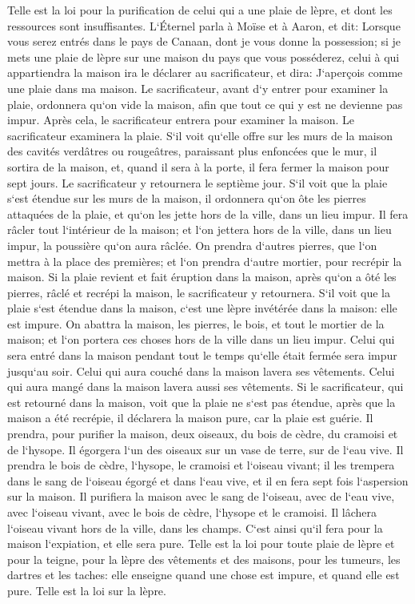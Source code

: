 \verse Telle est la loi pour la purification de celui qui a une plaie de lèpre, et dont les ressources sont insuffisantes. 
\verse L`Éternel parla à Moïse et à Aaron, et dit: 
\verse Lorsque vous serez entrés dans le pays de Canaan, dont je vous donne la possession; si je mets une plaie de lèpre sur une maison du pays que vous posséderez, 
\verse celui à qui appartiendra la maison ira le déclarer au sacrificateur, et dira: J`aperçois comme une plaie dans ma maison. 
\verse Le sacrificateur, avant d`y entrer pour examiner la plaie, ordonnera qu`on vide la maison, afin que tout ce qui y est ne devienne pas impur. Après cela, le sacrificateur entrera pour examiner la maison. 
\verse Le sacrificateur examinera la plaie. S`il voit qu`elle offre sur les murs de la maison des cavités verdâtres ou rougeâtres, paraissant plus enfoncées que le mur, 
\verse il sortira de la maison, et, quand il sera à la porte, il fera fermer la maison pour sept jours. 
\verse Le sacrificateur y retournera le septième jour. S`il voit que la plaie s`est étendue sur les murs de la maison, 
\verse il ordonnera qu`on ôte les pierres attaquées de la plaie, et qu`on les jette hors de la ville, dans un lieu impur. 
\verse Il fera râcler tout l`intérieur de la maison; et l`on jettera hors de la ville, dans un lieu impur, la poussière qu`on aura râclée. 
\verse On prendra d`autres pierres, que l`on mettra à la place des premières; et l`on prendra d`autre mortier, pour recrépir la maison. 
\verse Si la plaie revient et fait éruption dans la maison, après qu`on a ôté les pierres, râclé et recrépi la maison, 
\verse le sacrificateur y retournera. S`il voit que la plaie s`est étendue dans la maison, c`est une lèpre invétérée dans la maison: elle est impure. 
\verse On abattra la maison, les pierres, le bois, et tout le mortier de la maison; et l`on portera ces choses hors de la ville dans un lieu impur. 
\verse Celui qui sera entré dans la maison pendant tout le temps qu`elle était fermée sera impur jusqu`au soir. 
\verse Celui qui aura couché dans la maison lavera ses vêtements. Celui qui aura mangé dans la maison lavera aussi ses vêtements. 
\verse Si le sacrificateur, qui est retourné dans la maison, voit que la plaie ne s`est pas étendue, après que la maison a été recrépie, il déclarera la maison pure, car la plaie est guérie. 
\verse Il prendra, pour purifier la maison, deux oiseaux, du bois de cèdre, du cramoisi et de l`hysope. 
\verse Il égorgera l`un des oiseaux sur un vase de terre, sur de l`eau vive. 
\verse Il prendra le bois de cèdre, l`hysope, le cramoisi et l`oiseau vivant; il les trempera dans le sang de l`oiseau égorgé et dans l`eau vive, et il en fera sept fois l`aspersion sur la maison. 
\verse Il purifiera la maison avec le sang de l`oiseau, avec de l`eau vive, avec l`oiseau vivant, avec le bois de cèdre, l`hysope et le cramoisi. 
\verse Il lâchera l`oiseau vivant hors de la ville, dans les champs. C`est ainsi qu`il fera pour la maison l`expiation, et elle sera pure. 
\verse Telle est la loi pour toute plaie de lèpre et pour la teigne, 
\verse pour la lèpre des vêtements et des maisons, 
\verse pour les tumeurs, les dartres et les taches: 
\verse elle enseigne quand une chose est impure, et quand elle est pure. Telle est la loi sur la lèpre. 

